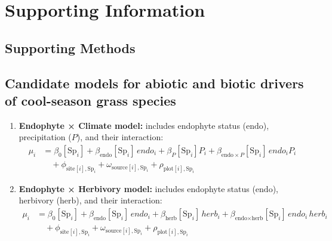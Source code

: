 \documentclass[12pt]{article}\usepackage[]{graphicx}\usepackage[dvipsnames]{xcolor}
\begin{document}
{%
\setcounter{figure}{0}
\setcounter{table}{0}
\setcounter{equation}{0}
\setcounter{section}{0}

\renewcommand{\thesection}{S.\arabic{section}}

\renewcommand{\theequation}{S\arabic{equation}}

\renewcommand{\figurename}{Fig}       %
\renewcommand{\thefigure}{S\arabic{figure}}  %



\renewcommand{\thetable}{S\arabic{table}}
\renewcommand{\tablename}{Table}    %

\section{Supporting Information}

\subsection{Supporting Methods}
\subsection*{Candidate models for abiotic and biotic drivers of cool-season grass species} \label{sec:models}
\begin{enumerate}
    \item \textbf{Endophyte × Climate model:} includes endophyte status ($\text{endo}$), precipitation ($P$), and their interaction:
    \begin{align*}
    \mu_i &= \beta_0[\text{Sp}_i] + \beta_{\text{endo}}[\text{Sp}_i]\,endo_i + \beta_P[\text{Sp}_i] P_i 
            + \beta_{\text{endo}\times P}[\text{Sp}_i]\,endo_i P_i \\
    &\quad + \phi_{\text{site}[i],\text{Sp}_i} + \omega_{\text{source}[i],\text{Sp}_i} + \rho_{\text{plot}[i],\text{Sp}_i}
    \end{align*}

    \item \textbf{Endophyte × Herbivory model:} includes endophyte status ($\text{endo}$), herbivory ($\text{herb}$), and their interaction:
    \begin{align*}
    \mu_i &= \beta_0[\text{Sp}_i] + \beta_{\text{endo}}[\text{Sp}_i]\,endo_i + \beta_{\text{herb}}[\text{Sp}_i]\,herb_i 
            + \beta_{\text{endo}\times \text{herb}}[\text{Sp}_i]\,endo_i\,herb_i \\
    &\quad + \phi_{\text{site}[i],\text{Sp}_i} + \omega_{\text{source}[i],\text{Sp}_i} + \rho_{\text{plot}[i],\text{Sp}_i}
    \end{align*}


\end{enumerate}}
\end{document}
